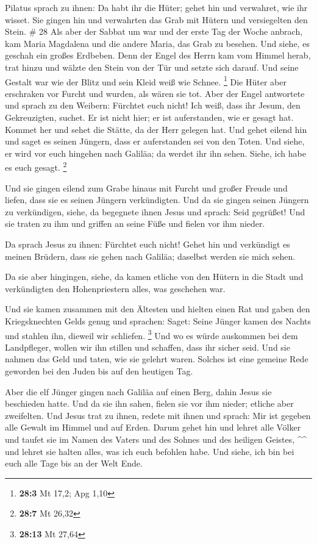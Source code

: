 Pilatus sprach zu ihnen: Da habt ihr die Hüter; gehet
hin und verwahret, wie ihr wisset.  Sie gingen hin und
verwahrten das Grab mit Hütern und versiegelten den Stein. \# 28
 Als aber der Sabbat um war und der erste Tag der Woche
anbrach, kam Maria Magdalena und die andere Maria, das Grab zu besehen.
 Und siehe, es geschah ein großes Erdbeben. Denn der Engel
des Herrn kam vom Himmel herab, trat hinzu und wälzte den Stein von der
Tür und setzte sich darauf.  Und seine Gestalt war wie der
Blitz und sein Kleid weiß wie Schnee. \footnote{\textbf{28:3} Mt 17,2;
  Apg 1,10}  Die Hüter aber erschraken vor Furcht und
wurden, als wären sie tot.  Aber der Engel antwortete und
sprach zu den Weibern: Fürchtet euch nicht! Ich weiß, dass ihr Jesum,
den Gekreuzigten, suchet.  Er ist nicht hier; er ist
auferstanden, wie er gesagt hat. Kommet her und sehet die Stätte, da der
Herr gelegen hat.  Und gehet eilend hin und saget es
seinen Jüngern, dass er auferstanden sei von den Toten. Und siehe, er
wird vor euch hingehen nach Galiläa; da werdet ihr ihn sehen. Siehe, ich
habe es euch gesagt. \footnote{\textbf{28:7} Mt 26,32}

 Und sie gingen eilend zum Grabe hinaus mit Furcht und
großer Freude und liefen, dass sie es seinen Jüngern verkündigten. Und
da sie gingen seinen Jüngern zu verkündigen,  siehe, da
begegnete ihnen Jesus und sprach: Seid gegrüßet! Und sie traten zu ihm
und griffen an seine Füße und fielen vor ihm nieder.

 Da sprach Jesus zu ihnen: Fürchtet euch nicht! Gehet hin
und verkündigt es meinen Brüdern, dass sie gehen nach Galiläa; daselbst
werden sie mich sehen.

 Da sie aber hingingen, siehe, da kamen etliche von den
Hütern in die Stadt und verkündigten den Hohenpriestern alles, was
geschehen war.

 Und sie kamen zusammen mit den Ältesten und hielten
einen Rat und gaben den Kriegsknechten Gelds genug  und
sprachen: Saget: Seine Jünger kamen des Nachts und stahlen ihn, dieweil
wir schliefen. \footnote{\textbf{28:13} Mt 27,64}  Und wo
es würde auskommen bei dem Landpfleger, wollen wir ihn stillen und
schaffen, dass ihr sicher seid.  Und sie nahmen das Geld
und taten, wie sie gelehrt waren. Solches ist eine gemeine Rede geworden
bei den Juden bis auf den heutigen Tag.

 Aber die elf Jünger gingen nach Galiläa auf einen Berg,
dahin Jesus sie beschieden hatte.  Und da sie ihn sahen,
fielen sie vor ihm nieder; etliche aber zweifelten.  Und
Jesus trat zu ihnen, redete mit ihnen und sprach: Mir ist gegeben alle
Gewalt im Himmel und auf Erden.  Darum gehet hin und
lehret alle Völker und taufet sie im Namen des Vaters und des Sohnes und
des heiligen Geistes, \^{}\^{}  und lehret sie halten
alles, was ich euch befohlen habe. Und siehe, ich bin bei euch alle Tage
bis an der Welt Ende.
